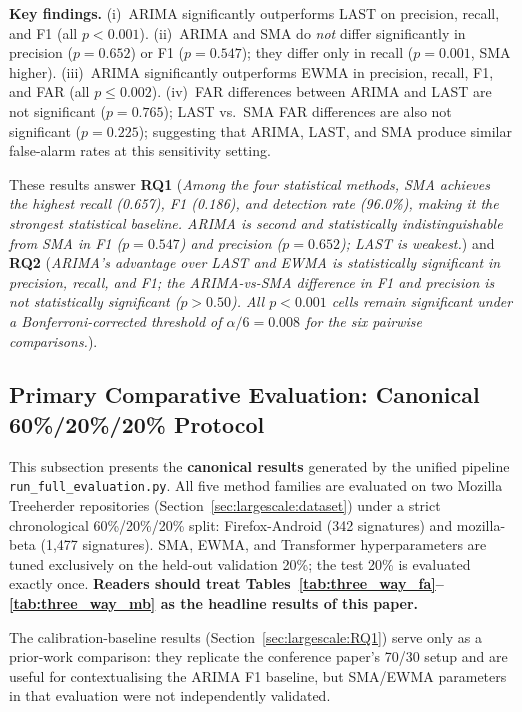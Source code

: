 \documentclass[pdflatex,sn-nature]{sn-jnl}
\theoremstyle{thmstyleone}%
\begin{document}
\textbf{Key findings.}
(i)~ARIMA significantly outperforms LAST on precision, recall, and F1 (all $p<0.001$).
(ii)~ARIMA and SMA do \emph{not} differ significantly in precision ($p=0.652$)
or F1 ($p=0.547$); they differ only in recall ($p=0.001$, SMA higher).
(iii)~ARIMA significantly outperforms EWMA in precision, recall, F1, and FAR (all $p \leq 0.002$).
(iv)~FAR differences between ARIMA and LAST are not significant ($p=0.765$);
LAST vs.\ SMA FAR differences are also not significant ($p=0.225$);
suggesting that ARIMA, LAST, and SMA produce similar false-alarm rates
at this sensitivity setting.

These results answer \textbf{RQ1} (\emph{Among the four statistical methods,
SMA achieves the highest recall (0.657), F1 (0.186), and detection rate (96.0\%),
making it the strongest statistical baseline.
ARIMA is second and statistically indistinguishable from SMA in F1 ($p=0.547$)
and precision ($p=0.652$); LAST is weakest.})
and \textbf{RQ2} (\emph{ARIMA's advantage over LAST and EWMA is statistically
significant in precision, recall, and F1; the ARIMA-vs-SMA difference in F1
and precision is not statistically significant ($p > 0.50$).
All $p<0.001$ cells remain significant under a Bonferroni-corrected threshold
of $\alpha/6 = 0.008$ for the six pairwise comparisons.}).

\subsection{Primary Comparative Evaluation: Canonical 60\%/20\%/20\% Protocol}\label{sec:three_way}

This subsection presents the \textbf{canonical results} generated by the
unified pipeline \texttt{run\_full\_evaluation.py}.
All five method families are evaluated on two Mozilla Treeherder repositories
(Section~\ref{sec:largescale:dataset}) under a strict chronological
60\%/20\%/20\% split: Firefox-Android (342 signatures) and mozilla-beta
(1{,}477 signatures).
SMA, EWMA, and Transformer hyperparameters are tuned exclusively on the
held-out validation 20\%; the test 20\% is evaluated exactly once.
\textbf{Readers should treat
Tables~\ref{tab:three_way_fa}--\ref{tab:three_way_mb} as the headline
results of this paper.}

The calibration-baseline results (Section~\ref{sec:largescale:RQ1}) serve
only as a prior-work comparison: they replicate the conference paper's 70/30
setup and are useful for contextualising the ARIMA F1 baseline, but
SMA/EWMA parameters in that evaluation were not independently validated.
\end{document}
